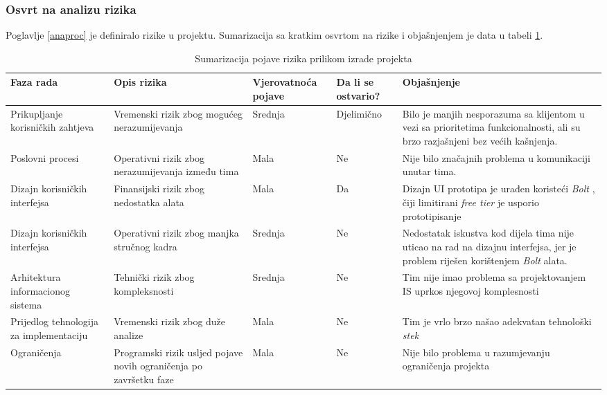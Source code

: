 \subsubsection{Osvrt na analizu rizika}

Poglavlje \ref{anaproc} je definiralo rizike u projektu. Sumarizacija sa kratkim osvrtom na rizike i objašnjenjem je data u tabeli \ref{tab:finiz}.

\begin{table}[p]
    \centering
    \begin{tabular}{m{3cm}|m{3cm}|m{3cm}|m{3cm}|m{3cm}}
        \textbf{ Faza rada} & \textbf{Opis rizika} & \textbf{Vjerovatnoća pojave} &\textbf{ Da li se ostvario? }& \textbf{Objašnjenje }\\
         \hline
         Prikupljanje korisničkih zahtjeva & Vremenski rizik zbog mogućeg nerazumijevanja & Srednja & Djelimično & Bilo je manjih nesporazuma sa klijentom u vezi sa prioritetima funkcionalnosti, ali su brzo razjašnjeni bez većih kašnjenja.\\ \hline
          Poslovni procesi & Operativni rizik zbog nerazumijevanja između tima & Mala & Ne &Nije bilo značajnih problema u komunikaciji unutar tima.\\ 
          \hline
          Dizajn korisničkih interfejsa & Finansijski rizik zbog nedostatka alata & Mala & Da &Dizajn UI prototipa je urađen koristeći  \textit{ Bolt} , čiji limitirani \textit{ free tier} je usporio prototipisanje\\ 
          \hline
          Dizajn korisničkih interfejsa & Operativni rizik zbog manjka stručnog kadra & Srednja & Ne & Nedostatak iskustva kod dijela tima nije uticao na rad na dizajnu interfejsa, jer je problem riješen korištenjem \textit{ Bolt} alata.\\ 
          \hline
          Arhitektura informacionog sistema & Tehnički rizik zbog kompleksnosti & Srednja & Ne &Tim nije imao problema sa projektovanjem IS uprkos njegovoj komplesnosti\\ 
          \hline
          Prijedlog tehnologija za implementaciju & Vremenski rizik zbog duže analize & Mala & Ne &Tim je vrlo brzo našao adekvatan tehnološki \textit{ stek}\\ 
          \hline
          Ograničenja & Programski rizik usljed pojave novih ograničenja po završetku faze & Mala & Ne & Nije bilo problema u razumjevanju ograničenja projekta\\ 
    \end{tabular}
    \caption{Sumarizacija pojave rizika prilikom izrade projekta}
    \label{tab:finiz}
\end{table}

